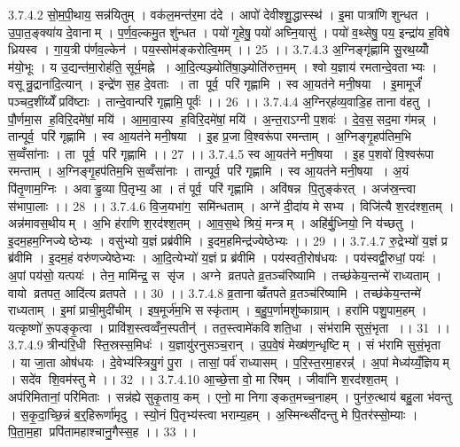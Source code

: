 3.7.4.2
सो॒म॒पी॒थाय॒ सन्न॑यितुम् । वक॑ल॒मन्त॑र॒मा द॑दे । आपो॑ देवीश्शु॒द्धास्स्थ॑ । इ॒मा पात्रा॑णि शुन्धत । उ॒पा॒त॒ङ्क्या॑य दे॒वानाम् । प॒र्ण॒व॒ल्कमु॒त शु॑न्धत । पयो॑ गृ॒हेषु॒ पयो॑ अघ्नि॒यासु॑ । पयो॑ व॒थ्सेषु॒ पय॒ इन्द्रा॑य ह॒विषे ध्रियस्व । गा॒य॒त्री प॑र्णव॒ल्केन॑ । पय॒स्सोम॑ङ्करोत्वि॒मम् ।। 25 ।।
3.7.4.3
अ॒ग्निङ्गृ॑ह्णामि सु॒रथ॒य्योँ म॑यो॒भूः । य उ॒द्यन्त॑मा॒रोह॑ति॒ सूर्य॒मह्ने । आ॒दि॒त्यञ्ज्योति॑षा॒ञ्ज्योति॑रुत्त॒मम् । श्वो य॒ज्ञाय॑ रमतान्दे॒वताभ्यः । वसून्रु॒द्राना॑दि॒त्यान् । इन्द्रे॑ण स॒ह दे॒वताः । ता पूर्व॒ परि॑ गृह्णामि । स्व आ॒यत॑ने मनी॒षया । इ॒मामूर्जं॑ पञ्चद॒शींय्येँ प्रवि॑ष्टाः । तान्दे॒वान्परि॑ गृह्णामि॒ पूर्वः॑ ।। 26 ।।
3.7.4.4
अ॒ग्निर्‌ह॑व्य॒वाडि॒ह ताना व॑हतु । पौ॒र्णमा॒स ह॒विरि॒दमे॑षां॒ मयि॑ । आ॒मा॒वा॒स्य॑ ह॒विरि॒दमे॑षां॒ मयि॑ । अ॒न्त॒राऽग्नी प॒शवः॑ । दे॒व॒स॒॒सद॒मा ग॑मन्न् । तान्पूर्व॒ परि॑ गृह्णामि । स्व आ॒यत॑ने मनी॒षया । इ॒ह प्र॒जा वि॒श्वरू॑पा रमन्ताम् । अ॒ग्निङ्गृ॒हप॑तिम॒भि स॒व्वँसा॑नाः । ता पूर्व॒ परि॑ गृह्णामि ।। 27 ।।
3.7.4.5
स्व आ॒यत॑ने मनी॒षया । इ॒ह प॒शवो॑ वि॒श्वरू॑पा रमन्ताम् । अ॒ग्निङ्गृ॒हप॑तिम॒भि स॒व्वँसा॑नाः । तान्पूर्व॒ परि॑ गृह्णामि । स्व आ॒यत॑ने मनी॒षया । अ॒यं पि॑तृ॒णाम॒ग्निः । अवाड्ढ॒व्या पि॒तृभ्य॒ आ । तं पूर्व॒ परि॑ गृह्णामि । अवि॑षन्न पि॒तुङ्क॑रत् । अज॑स्र॒न्त्वा स॑भापा॒लाः ।। 28 ।।
3.7.4.6
वि॒ज॒यभा॑ग॒॒ समि॑न्धताम् । अग्ने॑ दी॒दा॑य मे सभ्य । विजि॑त्यै श॒रद॑श्श॒तम् । अन्न॑मावस॒थीयम् । अ॒भि ह॑राणि श॒रद॑श्श॒तम् । आ॒व॒स॒थे श्रियं॒ मन्त्रम् । अहि॑र्बु॒ध्नियो॒ नि य॑च्छतु । इ॒दम॒हम॒ग्निज्येष्ठेभ्यः । वसु॑भ्यो य॒ज्ञं प्रब्र॑वीमि । इ॒दम॒हमिन्द्र॑ज्येष्ठेभ्यः ।। 29 ।।
3.7.4.7
रु॒द्रेभ्यो॑ य॒ज्ञं प्र ब्र॑वीमि । इ॒दम॒हं वरु॑णज्येष्ठेभ्यः । आ॒दि॒त्येभ्यो॑ य॒ज्ञं प्र ब्र॑वीमि । पय॑स्वती॒रोष॑धयः । पय॑स्वद्वी॒रुधां॒ पयः॑ । अ॒पां पय॑सो॒ यत्पयः॑ । तेन॒ मामि॑न्द्र॒ स सृ॑ज । अग्ने व्रतपते व्र॒तञ्च॑रिष्यामि । तच्छ॑केय॒न्तन्मे॑ राध्यताम् । वायो व्रतपत॒ आदि॑त्य व्रतपते ।। 30 ।।
3.7.4.8
व्र॒तानाव्व्रँतपते व्र॒तञ्च॑रिष्यामि । तच्छ॑केय॒न्तन्मे॑ राध्यताम् । इ॒मां प्राची॒मुदी॑चीम् । इष॒मूर्ज॑म॒भि सस्कृ॑ताम् । ब॒हु॒प॒र्णामशु॑ष्काग्राम् । हरा॑मि पशु॒पाम॒हम् । यत्कृष्णो॑ रू॒पङ्कृ॒त्वा । प्रावि॑श॒स्त्वव्वँन॒स्पतीन्॑ । तत॒स्त्वामे॑कविशति॒धा । संभ॑रामि सुसं॒भृता ।। 31 ।।
3.7.4.9
त्रीन्प॑रि॒धी स्ति॒स्रस्स॒मिधः॑ । य॒ज्ञायु॑रनुसञ्च॒रान् । उ॒प॒वे॒षं मेख्ष॑ण॒न्धृष्टिम् । सं भ॑रामि सुसं॒भृता । या जा॒ता ओष॑धयः । दे॒वेभ्य॑स्त्रियु॒गं पु॒रा । तासां॒ पर्व॑ राध्यासम् । प॒रि॒स्त॒रमा॒हरन्न्॑॑ । अ॒पां मेध्य॑य्यँ॒ज्ञियम् । सदे॑व शि॒वम॑स्तु मे ।। 32 ।।
3.7.4.10
आ॒च्छे॒त्ता वो॒ मा रि॑षम् । जीवा॑नि श॒रद॑श्श॒तम् । अप॑रिमितानां॒ परि॑मिताः । सन्न॑ह्ये सुकृ॒ताय॒ कम् । एनो॒ मा निगाङ्कत॒मच्च॒नाहम् । पुन॑रु॒त्थाय॑ बहु॒ला भ॑वन्तु । स॒कृ॒दा॒च्छि॒न्नं ब॒र्॒हिरूर्णा॑मृदु । स्यो॒नं पि॒तृभ्य॑स्त्वा भराम्य॒हम् । अ॒स्मिन्थ्सी॑दन्तु मे पि॒तर॑स्सो॒म्याः । पि॒ता॒म॒हा प्रपि॑तामहाश्चानु॒गैस्स॒ह ।। 33 ।।
